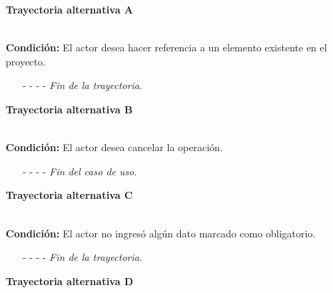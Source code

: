 \hypertarget{CU12-1-4:TAA}{\textbf{Trayectoria alternativa A}}\\
\noindent \textbf{Condición:} El actor desea hacer referencia a un elemento existente en el proyecto.
\begin{enumerate}
	\UCpaso[\UCactor] Ingresa el token correspondiente al elemento a referenciar.
	\UCpaso[\UCsist] Verifica que los tokens utilizados se encuentren correctamente estructurados, con base en la regla de negocio . 
	\UCpaso[\UCsist] Obtiene los elementos registrados en el proyecto correspondientes al token ingresado. 
	\UCpaso[\UCsist] Muestra una lista con los elementos encontrados.
	\UCpaso[\UCactor] Selecciona un elemento de la lista.
	\UCpaso[\UCsist] Verifica que el nombre del elemento seleccionado no contenga espacios. \hyperlink{CU12-1-4:TAF}{[Trayectoria F]}
	\UCpaso[\UCsist] Agrega la referencia del elemento al texto. \label{CU12.1.4-TA1}
	\UCpaso Continúa en el paso \ref{CU12.1.4-P3} de la trayectoria principal.
	\item[- -] - - {\em {Fin de la trayectoria}}.%
\end{enumerate}
\hypertarget{CU12-1-4:TAB}{\textbf{Trayectoria alternativa B}}\\
\noindent \textbf{Condición:} El actor desea cancelar la operación.
\begin{enumerate}
	\UCpaso[\UCactor] Solicita cancelar la operación oprimiendo el botón  de la pantalla .
	\UCpaso[\UCsist] Muestra la pantalla .
	\item[- -] - - {\em {Fin del caso de uso}}.%
\end{enumerate}
\hypertarget{CU12-1-4:TAC}{\textbf{Trayectoria alternativa C}}\\
\noindent \textbf{Condición:} El actor no ingresó algún dato marcado como obligatorio.
\begin{enumerate}
	\UCpaso[\UCsist] Muestra el mensaje  señalando el campo que presenta el error en la pantalla .
	\UCpaso Regresa al paso \ref{CU12.1.4-P3} de la trayectoria principal.
	\item[- -] - - {\em {Fin de la trayectoria}}.%
\end{enumerate}
\hypertarget{CU12-1-4:TAD}{\textbf{Trayectoria alternativa D}}\\
